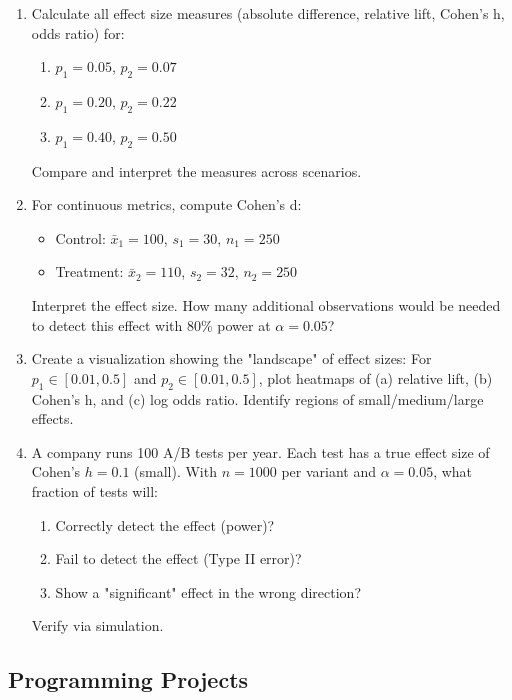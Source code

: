 \begin{enumerate}
    \item Calculate all effect size measures (absolute difference, relative lift, Cohen's h, odds ratio) for:
    \begin{enumerate}
        \item $p_1 = 0.05$, $p_2 = 0.07$
        \item $p_1 = 0.20$, $p_2 = 0.22$
        \item $p_1 = 0.40$, $p_2 = 0.50$
    \end{enumerate}
    Compare and interpret the measures across scenarios.

    \item For continuous metrics, compute Cohen's d:
    \begin{itemize}
        \item Control: $\bar{x}_1 = 100$, $s_1 = 30$, $n_1 = 250$
        \item Treatment: $\bar{x}_2 = 110$, $s_2 = 32$, $n_2 = 250$
    \end{itemize}
    Interpret the effect size. How many additional observations would be needed to detect this effect with 80\% power at $\alpha = 0.05$?

    \item Create a visualization showing the "landscape" of effect sizes: For $p_1 \in [0.01, 0.5]$ and $p_2 \in [0.01, 0.5]$, plot heatmaps of (a) relative lift, (b) Cohen's h, and (c) log odds ratio. Identify regions of small/medium/large effects.

    \item A company runs 100 A/B tests per year. Each test has a true effect size of Cohen's $h = 0.1$ (small). With $n = 1000$ per variant and $\alpha = 0.05$, what fraction of tests will:
    \begin{enumerate}
        \item Correctly detect the effect (power)?
        \item Fail to detect the effect (Type II error)?
        \item Show a "significant" effect in the wrong direction?
    \end{enumerate}
    Verify via simulation.
\end{enumerate}

\subsection{Programming Projects}

